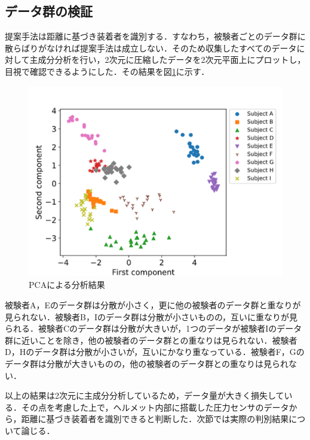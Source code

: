 \documentclass[Japanese]{dicomopapers}
\begin{document}
\subsection{データ群の検証}
提案手法は距離に基づき装着者を識別する．すなわち，被験者ごとのデータ群に散らばりがなければ提案手法は成立しない．そのため収集したすべてのデータに対して主成分分析を行い，2次元に圧縮したデータを2次元平面上にプロットし，目視で確認できるようにした．その結果を図\ref{pca}に示す．\par

\begin{figure}[!t]
  \begin{center}
    \includegraphics[width=1\linewidth]{figure/pca.eps}
  \end{center}
    \vspace{-8mm}
  \caption{PCAによる分析結果}
  \label{pca}
\end{figure}

被験者A，Eのデータ群は分散が小さく，更に他の被験者のデータ群と重なりが見られない．被験者B，Iのデータ群は分散が小さいものの，互いに重なりが見られる．被験者Cのデータ群は分散が大きいが，1つのデータが被験者Iのデータ群に近いことを除き，他の被験者のデータ群との重なりは見られない．被験者D，Hのデータ群は分散が小さいが，互いにかなり重なっている．被験者F，Gのデータ群は分散が大きいものの，他の被験者のデータ群との重なりは見られない．\par
以上の結果は2次元に主成分分析しているため，データ量が大きく損失している．その点を考慮した上で，ヘルメット内部に搭載した圧力センサのデータから，距離に基づき装着者を識別できると判断した．次節では実際の判別結果について論じる．
\end{document}
